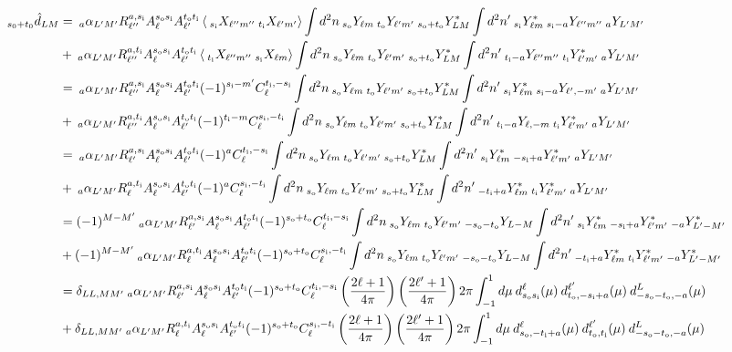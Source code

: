 \documentclass{article}
\newcommand{\si}[0]{{s_{\rm i}}}
\newcommand{\ti}[0]{{t_{\rm i}}}
\newcommand{\so}[0]{{s_{\rm o}}}
\renewcommand{\to}[0]{{t_{\rm o}}}
\newcommand{\av}[1]{\left\langle #1 \right\rangle}
\begin{document}
\begin{equation}
\begin{split}
	_{s_0 + t_0}\hat d_{LM}& =\:_a\alpha_{L'M'} R^{a, \si}_{\ell''}  A^{\so \si}_\ell  A^{\to \ti}_{\ell'} \av{\:_{\si}X_{\ell'' m''} \:_{\ti} X_{\ell' m'} }  \int d^2n \:_{\so}Y_{\ell m}\:_{\to}Y_{\ell' m'}\:_{\so + \to}Y^*_{LM} \int d^2n'   \:_{\si}Y^*_{\ell m}\:_{\si -a}Y_{\ell'' m''} \:_{a}Y_{L'M'}\\ 
	&+\:_a\alpha_{L'M'} R^{a, \ti}_{\ell''}  A^{\so \si}_\ell  A^{\to \ti}_{\ell'} \av{\:_{\ti}X_{\ell'' m''} \:_{\si} X_{\ell m} }  \int d^2n \:_{\so}Y_{\ell m}\:_{\to}Y_{\ell' m'}\:_{\so + \to}Y^*_{LM} \int d^2n' \:_{\ti -a}Y_{\ell'' m''} \:_{\ti}Y^*_{\ell' m'} \:_{a}Y_{L'M'}\\
	&= \:_a\alpha_{L'M'} R^{a, \si}_{\ell''}  A^{\so \si}_\ell  A^{\to \ti}_{\ell'} (-1)^{\si - m'}C_\ell^{\ti, -\si}\int d^2n \:_{\so}Y_{\ell m}\:_{\to}Y_{\ell' m'}\:_{\so + \to}Y^*_{LM} \int d^2n'   \:_{\si}Y^*_{\ell m}\:_{\si -a}Y_{\ell', -m'} \:_{a}Y_{L'M'}\\
	&+\:_a\alpha_{L'M'} R^{a, \ti}_{\ell''}  A^{\so \si}_\ell  A^{\to \ti}_{\ell'} (-1)^{\ti-m}C_\ell^{\si,-\ti}  \int d^2n \:_{\so}Y_{\ell m}\:_{\to}Y_{\ell' m'}\:_{\so + \to}Y^*_{LM} \int d^2n' \:_{\ti -a}Y_{\ell, -m} \:_{\ti}Y^*_{\ell' m'} \:_{a}Y_{L'M'}\\
		&= \:_a\alpha_{L'M'} R^{a, \si}_{\ell'}  A^{\so \si}_\ell  A^{\to \ti}_{\ell'} (-1)^{a}C_\ell^{\ti, -\si}\int d^2n \:_{\so}Y_{\ell m}\:_{\to}Y_{\ell' m'}\:_{\so + \to}Y^*_{LM} \int d^2n'   \:_{\si}Y^*_{\ell m}\:_{-\si +a}Y^*_{\ell'm'} \:_{a}Y_{L'M'}\\
	&+\:_a\alpha_{L'M'} R^{a, \ti}_{\ell}  A^{\so \si}_\ell  A^{\to \ti}_{\ell'} (-1)^{a}C_\ell^{\si,-\ti}  \int d^2n \:_{\so}Y_{\ell m}\:_{\to}Y_{\ell' m'}\:_{\so + \to}Y^*_{LM} \int d^2n' \:_{-\ti +a}Y^*_{\ell m} \:_{\ti}Y^*_{\ell' m'} \:_{a}Y_{L'M'}\\
	&= (-1)^{M-M'}\:_a\alpha_{L'M'} R^{a, \si}_{\ell'}  A^{\so \si}_\ell  A^{\to \ti}_{\ell'} (-1)^{\so+\to}C_\ell^{\ti, -\si}\int d^2n \:_{\so}Y_{\ell m}\:_{\to}Y_{\ell' m'}\:_{-\so - \to}Y_{L-M} \int d^2n'   \:_{\si}Y^*_{\ell m}\:_{-\si +a}Y^*_{\ell'm'} \:_{-a}Y^*_{L'-M'}\\
	&+(-1)^{M-M'}\:_a\alpha_{L'M'} R^{a, \ti}_{\ell}  A^{\so \si}_\ell  A^{\to \ti}_{\ell'} (-1)^{\so + \to}C_\ell^{\si,-\ti}  \int d^2n \:_{\so}Y_{\ell m}\:_{\to}Y_{\ell' m'}\:_{-\so - \to}Y_{L-M} \int d^2n' \:_{-\ti +a}Y^*_{\ell m} \:_{\ti}Y^*_{\ell' m'} \:_{-a}Y^*_{L'-M'}\\
	&= \delta_{LL,MM'}\:_a\alpha_{L'M'} R^{a, \si}_{\ell'}  A^{\so \si}_\ell  A^{\to \ti}_{\ell'} (-1)^{\so+\to}C_\ell^{\ti, -\si}  \left( \frac{2\ell + 1}{4\pi}\right) \left(\frac{2\ell' + 1}{4\pi} \right) 2\pi \int_{-1}^{1} d\mu \:d_{\so\si}^\ell (\mu)\: d_{\to,-\si + a}^{\ell'} (\mu)\:d_{-\so -\to,-a}^L(\mu) \\
	&+\delta_{LL,MM'}\:_a\alpha_{L'M'} R^{a, \ti}_{\ell}  A^{\so \si}_\ell  A^{\to \ti}_{\ell'} (-1)^{\so + \to}C_\ell^{\si,-\ti}\left(\frac{2\ell + 1}{4\pi} \right)\left(\frac{2\ell' + 1}{4\pi} \right) 2\pi \int_{-1}^{1} d\mu \:d_{\so,-\ti + a}^\ell (\mu)\: d_{\to,\ti}^{\ell'} (\mu)\:d_{-\so -\to,-a}^L(\mu)  \\
	\end{split}
\end{equation}
\end{document}
